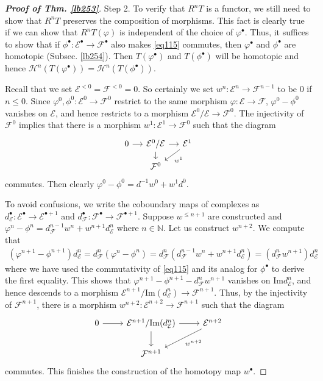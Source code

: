 \documentclass[12pt,b5paper,notitlepage]{report}
\theoremstyle{definition}
\theoremstyle{plain}
\newcommand{\mc}{\mathcal}
\newcommand{\blt}{\bullet}
\newcommand{\Nbb}{\mathbb N}
\newcommand{\Imag}{\mathrm{Im}}
\numberwithin{equation}{section}
\begin{document}
\begin{proof}[\textbf{Proof of Thm. \ref{lb253}}]
Step 2. To verify that $R^nT$ is a functor, we still need to show that $R^nT$ preserves the composition of morphisms. This fact is clearly true if we can show that $R^nT(\varphi)$ is independent of the choice of $\varphi^\blt$. Thus, it suffices to show that if $\phi^\blt:\mc E^\blt\rightarrow\mc F^\blt$ also makes \eqref{eq115} commutes, then $\varphi^\blt$ and $\phi^\blt$ are homotopic (Subsec. \ref{lb254}). Then $T(\varphi^\blt)$ and $T(\phi^\blt)$ will be homotopic and hence $\mc H^n(T(\varphi^\blt))=\mc H^n(T(\phi^\blt))$.

Recall that we set $\mc E^{<0}=\mc F^{<0}=0$. So certainly we set $w^n:\mc E^n\rightarrow\mc F^{n-1}$ to be $0$ if $n\leq 0$. Since $\varphi^0,\phi^0:\mc E^0\rightarrow\mc F^0$ restrict to the same morphism $\varphi:\mc E\rightarrow\mc F$, $\varphi^0-\phi^0$ vanishes on $\mc E$, and hence restricts to a morphism $\mc E^0/\mc E\rightarrow\mc F^0$. The injectivity of $\mc F^0$ implies that there is a morphism $w^1:\mc E^1\rightarrow\mc F^0$ such that the diagram 
\begin{equation*}
\begin{tikzcd}[sep=small]
0 \arrow[r] & \mc E^0/\mc E \arrow[r] \arrow[d] & \mc E^1 \arrow[ld,"w^1"] \\
            & \mc F^0                           &                   
\end{tikzcd}
\end{equation*}
commutes. Then clearly $\varphi^0-\phi^0=d^{-1}w^0+w^1d^0$.

To avoid confusions, we write the coboundary maps of complexes as $d^\blt_{\mc E}:\mc E^\blt\rightarrow\mc E^{\blt+1}$ and $d^\blt_{\mc F}:\mc F^\blt\rightarrow\mc F^{\blt+1}$. Suppose $w^{\leq n+1}$ are constructed and $\varphi^n-\phi^n=d^{n-1}_{\mc F}w^n+w^{n+1}d^n_{\mc E}$ where $n\in\Nbb$. Let us construct $w^{n+2}$. We compute that
\begin{align*}
(\varphi^{n+1}-\phi^{n+1})d_{\mc E}^n=d_{\mc F}^n(\varphi^n-\phi^n)=d_{\mc F}^n(d^{n-1}_{\mc F}w^n+w^{n+1}d^n_{\mc E})=(d_{\mc F}^nw^{n+1})d_{\mc E}^n
\end{align*}
where we have used the commutativity of \eqref{eq115} and its analog for $\phi^\blt$ to derive the first equality. This shows that $\varphi^{n+1}-\phi^{n+1}-d_{\mc F}^nw^{n+1}$ vanishes on $\Imag d_{\mc E}^n$, and hence descends to a morphism $\mc E^{n+1}/\Imag(d_{\mc E}^n)\rightarrow\mc F^{n+1}$. Thus, by the injectivity of $\mc F^{n+1}$, there is a morphism $w^{n+2}:\mc E^{n+2}\rightarrow\mc F^{n+1}$ such that the diagram 
\begin{equation*}
\begin{tikzcd}
0 \arrow[r] & \mc E^{n+1}/\Imag(d_{\mc E}^n)\arrow[r] \arrow[d] & \mc E^{n+2} \arrow[ld,"w^{n+2}"] \\
            & \mc F^{n+1}                          &                   
\end{tikzcd}
\end{equation*}
commutes. This finishes the construction of the homotopy map $w^\blt$.


\end{proof}
\end{document}
